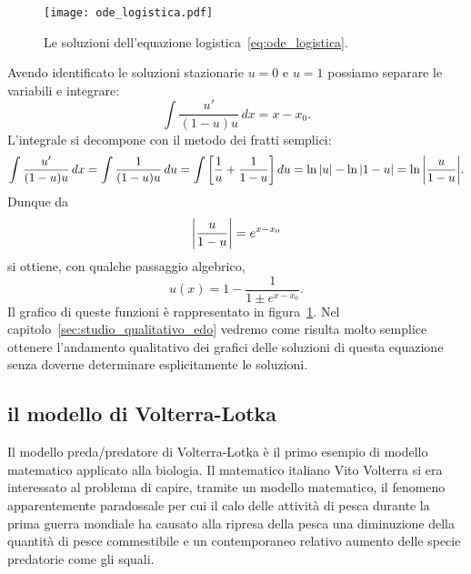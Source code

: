 \begin{figure}
  \texttt{[image: ode\_logistica.pdf]}
  \label{fig:ode_logistica}
  \caption{
Le soluzioni dell'equazione logistica~\eqref{eq:ode_logistica}.
}
\end{figure}

Avendo identificato le soluzioni stazionarie $u=0$ e $u=1$ possiamo separare le variabili
e integrare:
\[
 \int \frac{u'}{(1-u)u}\, dx = x - x_0.
\]
L'integrale si decompone con il metodo dei fratti semplici:
\[
  \int \frac{u'}{(1-u)u}\, dx
  = \int \frac{1}{(1-u)u}\, du 
  = \int {\left[ \frac{1}{u} + \frac{1}{1-u} \right]}\, du 
  = \ln {\left|u\right|} - \ln{\left|1-u\right|}
  = \ln {\left|\frac{u}{1-u}\right|}.
\]
Dunque da 
\[
{\left|\frac{u}{1-u}\right|} = e^{x-x_0}  
\]
si ottiene, con qualche passaggio algebrico,
\[
    u(x) = 1 - \frac{1}{1\pm e^{x-x_0}}.
\]
Il grafico di queste funzioni è rappresentato in figura~\ref{fig:ode_logistica}.
Nel capitolo~\ref{sec:studio_qualitativo_edo}
vedremo come risulta molto semplice ottenere l'andamento qualitativo dei grafici 
delle soluzioni di questa equazione senza doverne determinare esplicitamente 
le soluzioni.

\subsection{il modello di Volterra-Lotka}
%
%
%
%

Il modello preda/predatore di Volterra-Lotka è il primo esempio 
di modello matematico applicato alla biologia.
%
Il matematico italiano Vito Volterra si era interessato al problema 
di capire, tramite un modello matematico, il fenomeno apparentemente 
paradossale per cui il calo delle attività di pesca 
durante la prima guerra mondiale ha causato alla ripresa della pesca 
una diminuzione della 
quantità di pesce commestibile e un contemporaneo relativo aumento delle 
specie predatorie come gli squali.

